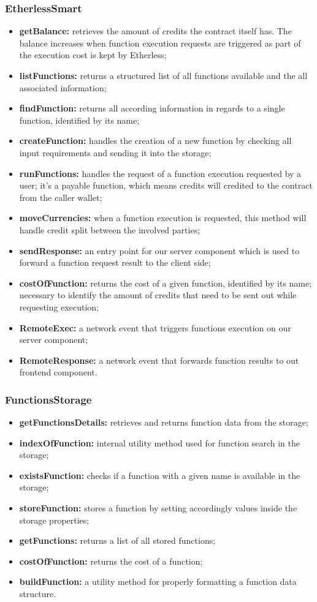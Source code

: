 \subsubsection{EtherlessSmart}
\begin{itemize}
	\item \textbf{getBalance:} retrieves the amount of credits the contract itself has. The balance increases when function execution requests are triggered as part of the execution cost is kept by Etherless;
	\item \textbf{listFunctions:} returns a structured list of all functions available and the all associated information;
	\item \textbf{findFunction:} returns all according information in regards to a single function, identified by its name;
	\item \textbf{createFunction:} handles the creation of a new function by checking all input requirements and sending it into the storage;
	\item \textbf{runFunctions:} handles the request of a function execution requested by a user; it's a payable function, which means credits will credited to the contract from the caller wallet;
	\item \textbf{moveCurrencies:} when a function execution is requested, this method will handle credit split between the involved parties;
	\item \textbf{sendResponse:} an entry point for our server component which is used to forward a function request result to the client side;
	\item \textbf{costOfFunction:} returns the cost of a given function, identified by its name; necessary to identify the amount of credits that need to be sent out while requesting execution;
	\item \textbf{RemoteExec:} a network event that triggers functions execution on our server component;
	\item \textbf{RemoteResponse:} a network event that forwards function results to out frontend component.
\end{itemize}
\subsubsection{FunctionsStorage}
\begin{itemize}
	\item \textbf{getFunctionsDetails:} retrieves and returns function data from the storage;
	\item \textbf{indexOfFunction:} internal utility method used for function search in the storage;
	\item \textbf{existsFunction:} checks if a function with a given name is available in the storage;
	\item \textbf{storeFunction:} stores a function by setting accordingly values inside the storage properties;
	\item \textbf{getFunctions:} returns a list of all stored functions;
	\item \textbf{costOfFunction:}  returns the cost of a function;
	\item \textbf{buildFunction:} a utility method for properly formatting a function data structure.
\end{itemize}
